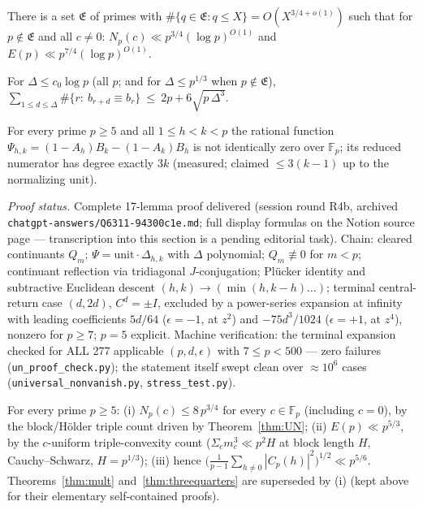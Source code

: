 \begin{theorem}\label{thm:threequarters}
There is a set $\mathfrak E$ of primes with
$\#\{q\in\mathfrak E: q\le X\}=O(X^{3/4+o(1)})$ such that for $p\notin\mathfrak E$
and all $c\ne0$: $N_p(c)\ll p^{3/4}(\log p)^{O(1)}$ and
$E(p)\ll p^{7/4}(\log p)^{O(1)}$.
\end{theorem}

\begin{theorem}\label{thm:shortlag}
For $\Delta\le c_0\log p$ (all $p$; and for $\Delta\le p^{1/3}$ when
$p\notin\mathfrak E$), $\sum_{1\le d\le\Delta}\#\{r:\ b_{r+d}\equiv b_r\}
\ \le\ 2p+6\sqrt{p\,\Delta^3}$.
\end{theorem}

\begin{theorem}\label{thm:UN}
For every prime $p\ge5$ and all $1\le h<k<p$ the rational function
$\Psi_{h,k}=(1-A_h)B_k-(1-A_k)B_h$ is not identically zero over $\mathbb F_p$;
its reduced numerator has degree exactly $3k$ (measured; claimed $\le3(k-1)$ up
to the normalizing unit).
\end{theorem}

\noindent\emph{Proof status.}  Complete 17-lemma proof delivered (session round
R4b, archived \texttt{chatgpt-answers/Q6311-94300c1e.md}; full display formulas
on the Notion source page — transcription into this section is a pending
editorial task).  Chain: cleared continuants $Q_m$; $\Psi=\mathrm{unit}\cdot
\Delta_{h,k}$ with $\Delta$ polynomial; $Q_m\not\equiv0$ for $m<p$; continuant
reflection via tridiagonal $J$-conjugation; Pl\"ucker identity and subtractive
Euclidean descent $(h,k)\to(\min(h,k-h)\dots)$; terminal central-return case
$(d,2d)$, $C^d=\pm I$, excluded by a power-series expansion at infinity with
leading coefficients $5d/64$ ($\epsilon=-1$, at $z^2$) and $-75d^3/1024$
($\epsilon=+1$, at $z^4$), nonzero for $p\ge7$; $p=5$ explicit.  Machine
verification: the terminal expansion checked for ALL 277 applicable $(p,d,
\epsilon)$ with $7\le p<500$ — zero failures (\texttt{un\_proof\_check.py});
the statement itself swept clean over $\approx10^6$ cases
(\texttt{universal\_nonvanish.py}, \texttt{stress\_test.py}).

\begin{theorem}\label{thm:final}
For every prime $p\ge5$: (i) $N_p(c)\le 8\,p^{3/4}$ for every $c\in\mathbb F_p$
(including $c=0$), by the block/H\"older triple count driven by
Theorem~\ref{thm:UN}; (ii) $E(p)\ll p^{5/3}$, by the $c$-uniform
triple-convexity count ($\Sigma_c m_c^3\ll p^2H$ at block length $H$,
Cauchy--Schwarz, $H=p^{1/3}$); (iii) hence
$\bigl(\tfrac1{p-1}\sum_{h\ne0}|C_p(h)|^2\bigr)^{1/2}\ll p^{5/6}$.
Theorems~\ref{thm:mult} and~\ref{thm:threequarters} are superseded by (i)
(kept above for their elementary self-contained proofs).
\end{theorem}

